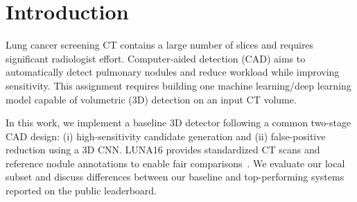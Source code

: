 \section{Introduction}
Lung cancer screening CT contains a large number of slices and requires significant radiologist effort. Computer-aided detection (CAD) aims to automatically detect pulmonary nodules and reduce workload while improving sensitivity. This assignment requires building one machine learning/deep learning model capable of volumetric (3D) detection on an input CT volume.

In this work, we implement a baseline 3D detector following a common two-stage CAD design: (i) high-sensitivity candidate generation and (ii) false-positive reduction using a 3D CNN. LUNA16 provides standardized CT scans and reference nodule annotations to enable fair comparisons~\cite{setio2017luna16}. We evaluate our local subset and discuss differences between our baseline and top-performing systems reported on the public leaderboard.